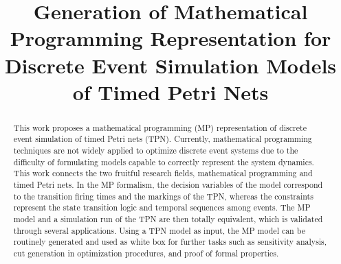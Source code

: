 \documentclass[suppldata]{interact}
\theoremstyle{plain}
\theoremstyle{definition}
\theoremstyle{remark}
\begin{document}
\author{
\medskip
{}
}


\title{\Large Generation of Mathematical Programming Representation for Discrete Event Simulation Models of Timed Petri Nets}

\maketitle

\bigskip
\begin{abstract}
This work proposes a mathematical programming (MP) representation of discrete event simulation of timed Petri nets (TPN). Currently, mathematical programming techniques are not widely applied to optimize discrete event systems due to the difficulty of formulating models capable to %
correctly represent the system dynamics. This work connects the two fruitful research fields, mathematical programming and timed Petri nets. In the MP formalism, the decision variables of the model %
correspond to the transition firing times and the markings of the TPN, whereas the constraints represent the state transition logic and temporal sequences among events. The MP model and a simulation run of the TPN are then totally equivalent, which is validated %
through several applications. Using a TPN model as input, the MP model can be routinely generated and used as white box for further %
tasks such as sensitivity analysis, cut generation in optimization procedures, and proof of formal properties.


\end{abstract}
\end{document}
